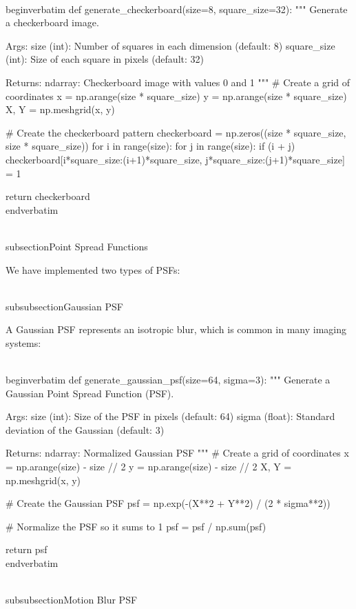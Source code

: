 \\begin{verbatim}
def generate_checkerboard(size=8, square_size=32):
    """
    Generate a checkerboard image.
    
    Args:
        size (int): Number of squares in each dimension (default: 8)
        square_size (int): Size of each square in pixels (default: 32)
        
    Returns:
        ndarray: Checkerboard image with values 0 and 1
    """
    # Create a grid of coordinates
    x = np.arange(size * square_size)
    y = np.arange(size * square_size)
    X, Y = np.meshgrid(x, y)
    
    # Create the checkerboard pattern
    checkerboard = np.zeros((size * square_size, size * square_size))
    for i in range(size):
        for j in range(size):
            if (i + j) % 2 == 0:
                checkerboard[i*square_size:(i+1)*square_size, 
                             j*square_size:(j+1)*square_size] = 1
    
    return checkerboard
\\end{verbatim}

\\subsection{Point Spread Functions}

We have implemented two types of PSFs:

\\subsubsection{Gaussian PSF}

A Gaussian PSF represents an isotropic blur, which is common in many imaging systems:

\\begin{verbatim}
def generate_gaussian_psf(size=64, sigma=3):
    """
    Generate a Gaussian Point Spread Function (PSF).
    
    Args:
        size (int): Size of the PSF in pixels (default: 64)
        sigma (float): Standard deviation of the Gaussian (default: 3)
        
    Returns:
        ndarray: Normalized Gaussian PSF
    """
    # Create a grid of coordinates
    x = np.arange(size) - size // 2
    y = np.arange(size) - size // 2
    X, Y = np.meshgrid(x, y)
    
    # Create the Gaussian PSF
    psf = np.exp(-(X**2 + Y**2) / (2 * sigma**2))
    
    # Normalize the PSF so it sums to 1
    psf = psf / np.sum(psf)
    
    return psf
\\end{verbatim}

\\subsubsection{Motion Blur PSF}

